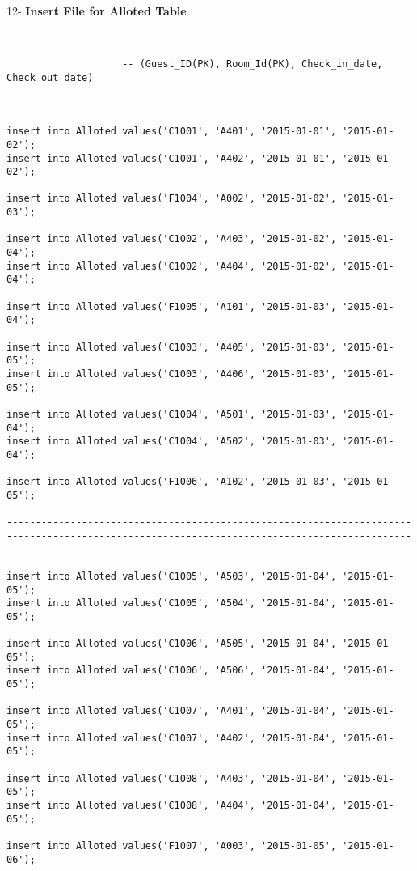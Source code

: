 \documentclass[a4,12pt]{report}
\begin{document}
\begin{flushleft}
12- \textbf{ Insert File for Alloted Table}
\end{flushleft}

\begin{lstlisting}


                    -- (Guest_ID(PK), Room_Id(PK), Check_in_date, Check_out_date)



insert into Alloted values('C1001', 'A401', '2015-01-01', '2015-01-02');
insert into Alloted values('C1001', 'A402', '2015-01-01', '2015-01-02');

insert into Alloted values('F1004', 'A002', '2015-01-02', '2015-01-03');

insert into Alloted values('C1002', 'A403', '2015-01-02', '2015-01-04');
insert into Alloted values('C1002', 'A404', '2015-01-02', '2015-01-04');

insert into Alloted values('F1005', 'A101', '2015-01-03', '2015-01-04');

insert into Alloted values('C1003', 'A405', '2015-01-03', '2015-01-05');
insert into Alloted values('C1003', 'A406', '2015-01-03', '2015-01-05');

insert into Alloted values('C1004', 'A501', '2015-01-03', '2015-01-04');
insert into Alloted values('C1004', 'A502', '2015-01-03', '2015-01-04');

insert into Alloted values('F1006', 'A102', '2015-01-03', '2015-01-05');

------------------------------------------------------------------------------------------------------------------------------------------------

insert into Alloted values('C1005', 'A503', '2015-01-04', '2015-01-05');
insert into Alloted values('C1005', 'A504', '2015-01-04', '2015-01-05');

insert into Alloted values('C1006', 'A505', '2015-01-04', '2015-01-05');
insert into Alloted values('C1006', 'A506', '2015-01-04', '2015-01-05');

insert into Alloted values('C1007', 'A401', '2015-01-04', '2015-01-05');
insert into Alloted values('C1007', 'A402', '2015-01-04', '2015-01-05');

insert into Alloted values('C1008', 'A403', '2015-01-04', '2015-01-05');
insert into Alloted values('C1008', 'A404', '2015-01-04', '2015-01-05');

insert into Alloted values('F1007', 'A003', '2015-01-05', '2015-01-06');


\end{lstlisting}
\end{document}
